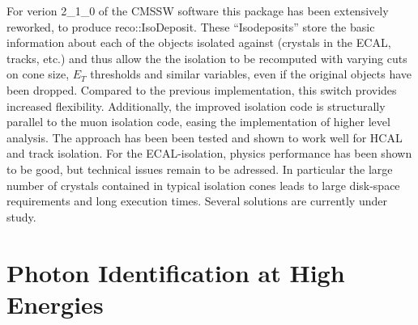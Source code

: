 \documentclass{cmspaper}
\begin{document}
For verion 2\_1\_0 of the CMSSW software this package has been extensively reworked, to produce 
reco::IsoDeposit. These ``Isodeposits'' store the basic information about each of the objects isolated against (crystals in the ECAL, tracks, etc.) 
and thus allow the the isolation to be recomputed with varying cuts on cone size, $E_T$ thresholds and similar variables,
 even if the original objects have been dropped.
Compared to the previous implementation, this switch provides increased flexibility. Additionally, the improved
isolation code is structurally parallel to the muon isolation code, easing the implementation of higher level analysis.
The approach has been been tested and shown to work well for HCAL and track isolation.
For the ECAL-isolation, physics performance has been shown to be good, but technical issues remain to be adressed. 
In particular the large number of crystals contained in typical isolation cones leads to large disk-space requirements and long
execution times. Several solutions are currently under study.

\section{Photon Identification at High Energies}
\end{document}
